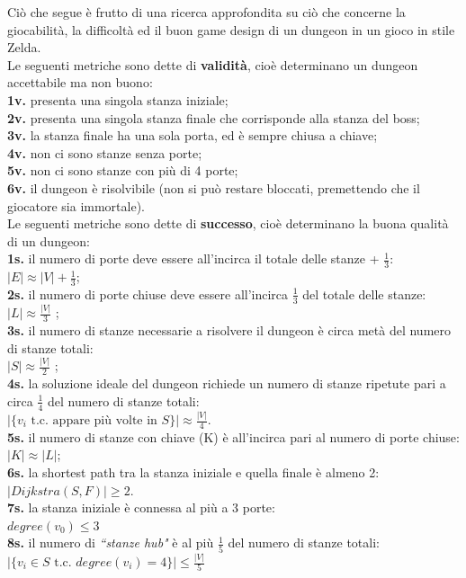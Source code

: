\documentclass[12pt,titlepage]{article}
\begin{document}
Ciò che segue è frutto di una ricerca approfondita su ciò che concerne la giocabilità, la difficoltà ed il buon game design di un dungeon in un gioco in stile Zelda.\cite{metazelda}\cite{hacker}\\

\noindent Le seguenti metriche sono dette di \textbf{validità}, cioè determinano un dungeon accettabile ma non buono:\\
\textbf{1v.} presenta una singola stanza iniziale;\\
\textbf{2v.} presenta una singola stanza finale che corrisponde alla stanza del boss;\\
\textbf{3v.} la stanza finale ha una sola porta, ed è sempre chiusa a chiave;\\
\textbf{4v.} non ci sono stanze senza porte;\\
\textbf{5v.} non ci sono stanze con più di 4 porte;\\
\textbf{6v.} il dungeon è risolvibile (non si può restare bloccati, premettendo che il giocatore sia immortale).\\

\noindent Le seguenti metriche sono dette di \textbf{successo}, cioè determinano la buona qualità di un dungeon:\\
\textbf{1s.} il numero di porte deve essere all'incirca il totale delle stanze + $\frac{1}{3}$:\\
$|E| \approx |V| + \frac{1}{3}$;\\
\textbf{2s.} il numero di porte chiuse deve essere all'incirca $\frac{1}{3}$ del totale delle stanze:\\
$|L| \approx \frac{|V|}{3}$
;\\
\textbf{3s.} il numero di stanze necessarie a risolvere il dungeon è circa metà del numero di stanze totali:\\
$|S| \approx \frac{|V|}{2}$
;\\
\textbf{4s.} la soluzione ideale del dungeon richiede un numero di stanze ripetute pari a circa $\frac{1}{4}$ del numero di stanze totali:\\
$|\{v_i \text{ t.c. appare più volte in } S\}| \approx \frac{|V|}{4}$.\\
\textbf{5s.} il numero di stanze con chiave (K) è all'incirca pari al numero di porte chiuse:\\
$|K| \approx |L|$;\\
\textbf{6s.} la shortest path tra la stanza iniziale e quella finale è almeno 2:\\
$|Dijkstra(S, F)| \geq 2$.\\
\textbf{7s.} la stanza iniziale è connessa al più a 3 porte:\\
$degree(v_0) \leq 3$\\
\textbf{8s.} il numero di \textit{``stanze hub"} è al più $\frac{1}{5}$ del numero di stanze totali:\\
$|\{v_i \in S \text{ t.c. } degree(v_i) = 4\}| \leq \frac{|V|}{5}$\\
\end{document}
